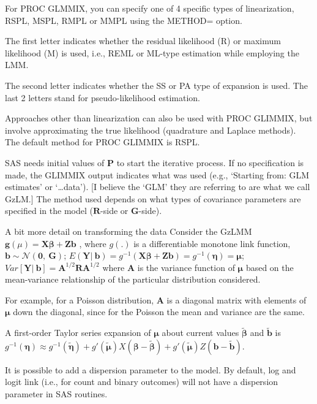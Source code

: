 \documentclass[
  9pt,
  ignorenonframetext,
]{beamer}
\begin{document}
\begin{frame}{}
\protect\hypertarget{section-1}{}
For PROC GLMMIX, you can specify one of 4 specific types of
linearization, RSPL, MSPL, RMPL or MMPL using the METHOD= option.

The first letter indicates whether the residual likelihood (R) or
maximum likelihood (M) is used, i.e., REML or ML-type estimation while
employing the LMM.

The second letter indicates whether the SS or PA type of expansion is
used. The last 2 letters stand for pseudo-likelihood estimation.

Approaches other than linearization can also be used with PROC GLIMMIX,
but involve approximating the true likelihood (quadrature and Laplace
methods). The default method for PROC GLIMMIX is RSPL.

SAS needs initial values of \(\pmb P\) to start the iterative process.
If no specification is made, the GLIMMIX output indicates what was used
(e.g., `Starting from: GLM estimates' or `\ldots data'). {[}I believe
the `GLM' they are referring to are what we call GzLM.{]} The method
used depends on what types of covariance parameters are specified in the
model (\(\pmb R\)-side or \(\pmb G\)-side).
\end{frame}

\begin{frame}{A bit more detail on transforming the data}
\protect\hypertarget{a-bit-more-detail-on-transforming-the-data}{}
Consider the GzLMM \(\pmb g(\mu)=\pmb {X\beta} + \pmb {Zb}\) , where
\(g(.)\) is a differentiable monotone link function,
\(\pmb b \sim \mathcal N(\pmb 0,\ \pmb G)\);
\(E(\pmb Y|\ \pmb b) = g^{-1} (\pmb {X\beta} + \pmb {Zb} )=g^{-1} (\pmb \eta)=\pmb \mu\);
\(Var[\pmb Y|\ \pmb b]=\pmb A^{1/2} \pmb R\pmb A^{1/2}\) where
\(\pmb A\) is the variance function of \(\pmb \mu\) based on the
mean-variance relationship of the particular distribution considered.

For example, for a Poisson distribution, \(\pmb A\) is a diagonal matrix
with elements of \(\pmb \mu\) down the diagonal, since for the Poisson
the mean and variance are the same.

A first-order Taylor series expansion of \(\pmb \mu\) about current
values \(\pmb {\tilde \beta}\) and \(\pmb {\tilde b}\) is
\(g^{-1} (\pmb \eta) \approx g^{-1} (\pmb {\tilde \eta} ) + g'(\pmb {\tilde \mu}) X(\pmb {\beta - {\tilde \beta}}) + g'(\pmb {\tilde \mu})Z(\pmb {b - \tilde b})\).

It is possible to add a dispersion parameter to the model. By default,
log and logit link (i.e., for count and binary outcomes) will not have a
dispersion parameter in SAS routines.
\end{frame}
\end{document}
